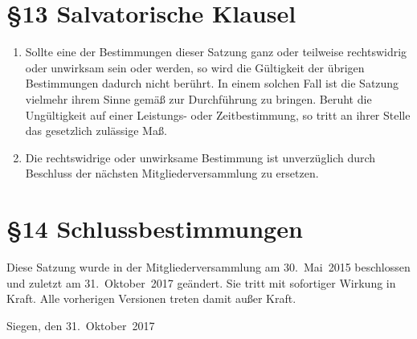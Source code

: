 \documentclass[11pt,ngerman]{article}
\begin{document}
\section*{§13 Salvatorische Klausel}
\begin{enumerate}
  \item Sollte eine der Bestimmungen dieser Satzung ganz oder teilweise rechtswidrig oder unwirksam sein oder werden, so wird die Gültigkeit der übrigen Bestimmungen dadurch nicht berührt. In einem solchen Fall ist die Satzung vielmehr ihrem Sinne gemäß zur Durchführung zu bringen. Beruht die Ungültigkeit auf einer Leistungs- oder Zeitbestimmung, so tritt an ihrer Stelle das gesetzlich zulässige Maß.

  \item Die rechtswidrige oder unwirksame Bestimmung ist unverzüglich durch Beschluss der nächsten Mitgliederversammlung zu ersetzen.
\end{enumerate}

\section*{§14 Schlussbestimmungen}
Diese Satzung wurde in der Mitgliederversammlung am 30.~Mai~2015 beschlossen und zuletzt am 31.~Oktober~2017 geändert. Sie tritt mit sofortiger Wirkung in Kraft. Alle vorherigen Versionen treten damit außer Kraft.

Siegen, den 31.~Oktober~2017
\end{document}
